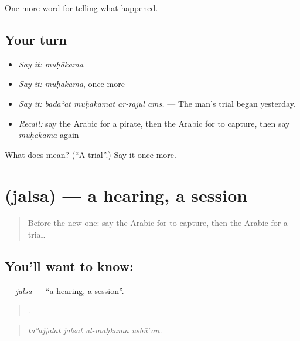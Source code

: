 \begin{grammarlens}[title={What you've built}]
One more word for telling what happened.
\end{grammarlens}

\subsection*{Your turn}
\begin{itemize}
\raggedright
  \item \emph{Say it:} \emph{muḥākama}
  \item \emph{Say it:} \emph{muḥākama}, once more
  \item \emph{Say it:} \emph{badaʾat muḥākamat ar-rajul ams.} — The man’s trial began yesterday.
  \item \emph{Recall:} say the Arabic for a pirate, then the Arabic for to capture, then say \emph{muḥākama} again
\end{itemize}

\begin{tcolorbox}[breakable,colback=teal!4,colframe=teal!35!black,title={Before you move on}]
What does  mean? (\textquotedblleft{}A trial\textquotedblright{}.) Say it once more.
\end{tcolorbox}
\section[\texorpdfstring{\ar{جلسة} (jalsa)}{جلسة (jalsa)}]{ (jalsa) — a hearing, a session}

\label{lesson:AR-C334-jalsa}



\begin{quote}
Before the new one: say the Arabic for to capture, then the Arabic for a trial.
\end{quote}

\subsection*{You'll want to know: }
\textbf{} — \emph{jalsa} — \textquotedblleft{}a hearing, a session\textquotedblright{}.

\begin{quote}
   .
\end{quote}

\begin{quote}
\emph{taʾajjalat jalsat al-maḥkama usbūʿan.}
\end{quote}

